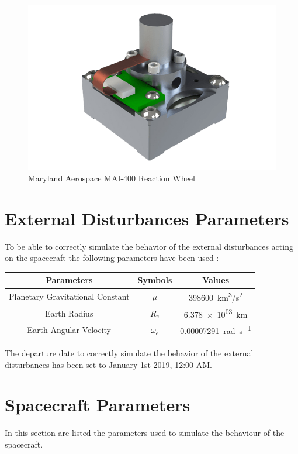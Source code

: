 \documentclass[11pt,a4paper]{report}
\begin{document}
\begin{figure}[H]
 	\centering
 	\includegraphics[scale=0.25]{gfx/mai_reaction_wheel.png}
    \caption{Maryland Aerospace MAI-400 Reaction Wheel}
\end{figure}

\section{External Disturbances Parameters}
To be able to correctly simulate the behavior of the external disturbances acting on the spacecraft the following parameters have been used : 

\begin{table}[H]
	\centering
	\begin{tabular}{|c|c|c|}
		\hline
		Parameters & Symbols & Values \\
		\hline	
		Planetary Gravitational Constant  & $\mu$ &  \SI{398600}{\kilo\meter^3/\second^2}\\
		\hline			
		Earth Radius & $R_e$ & \SI{6.378e+03}{\kilo\meter}\\
		\hline
		Earth Angular Velocity & $\omega_{e}$ & \SI{0.00007291}{\radian\per\second} \\
		\hline
	\end{tabular}
\end{table}

The departure date to correctly simulate the behavior of the external disturbances has been set to January 1st 2019, 12:00 AM.

\section{Spacecraft Parameters}
In this section are listed the parameters used to simulate the behaviour of the spacecraft.
\end{document}
